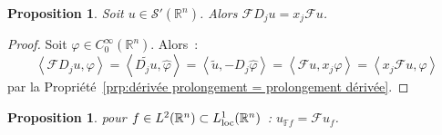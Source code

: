 \documentclass{report}
\newcommand{\R}{{\mathbb R}}
\newcommand{\scpr}[2]{\left\langle#1, #2\right\rangle}
\newcommand{\loc}{{\text{\textnormal{loc}}}}
\newtheorem{prp}[thm]{Proposition}
\theoremstyle{definition}
\theoremstyle{remark}
\begin{document}
\begin{prp} Soit $u \in \mathcal S'(\R^n)$. Alors $\mathcal FD_ju = x_j\mathcal Fu$.
\end{prp}

\begin{proof} Soit $\varphi \in C^\infty_0(\R^n)$. Alors~:
\[\scpr {\mathcal FD_ju}\varphi = \scpr {\widetilde {D_ju}}{\widehat \varphi} = \scpr {\widetilde u}{-D_j\widehat \varphi} = \scpr {\mathcal Fu}{x_j\varphi}
= \scpr {x_j\mathcal Fu}\varphi\]
par la Propriété~\ref{prp:dérivée prolongement = prolongement dérivée}.
\end{proof}

\begin{prp} pour $f \in L^2(\R^n) \subset L^1_\loc(\R^n)$~: $u_{\mathbb Ff} = \mathcal Fu_f$.
\end{prp}
\end{document}
